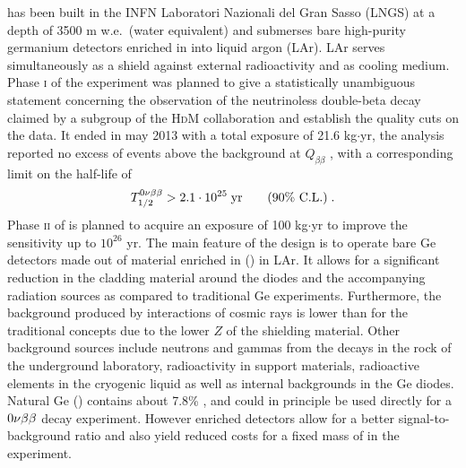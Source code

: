 {\gerda} has been built in the INFN Laboratori Nazionali del Gran Sasso (LNGS) at a depth of 3500 m w.e.~(water equivalent) and submerses bare high-purity germanium detectors enriched in  into liquid argon (LAr). LAr serves simultaneously as a shield against external radioactivity and as cooling medium. Phase \textsc{i} of the experiment was planned to give a statistically unambiguous statement concerning the observation of the neutrinoless double-beta decay claimed by a subgroup of the \textsc{HdM} collaboration \cite{hdmclaim} and establish the quality cuts on the data. It ended in may 2013 with a total exposure of 21.6 kg$\cdot$yr, the analysis reported no excess of events above the background at $Q_{\beta\beta}$ \cite{Agostini:2013mzu}, with a corresponding limit on the half-life of
\[T_{1/2}^{0\nu\beta\beta}>2.1\cdot10^{25}\;\text{yr}\qquad\text{(90\% C.L.)}\;.\]
Phase \textsc{ii} of {\gerda} is planned to acquire an exposure of 100 kg$\cdot$yr to improve the sensitivity up to $10^{26}$ yr.
\newpage
{} The main feature of the {\gerda} design is to operate bare Ge detectors made out of material enriched in  () in LAr. It allows for a significant reduction in the cladding material around the diodes and the accompanying radiation sources as compared to traditional Ge experiments. Furthermore, the background produced by interactions of cosmic rays is lower than for the traditional concepts due to the lower $Z$ of the shielding material. Other background sources include neutrons and gammas from the decays in the rock of the underground laboratory, radioactivity in support materials, radioactive elements in the cryogenic liquid as well as internal backgrounds in the Ge diodes. Natural Ge () contains about 7.8\% , and could in principle be used directly for a $0\nu\beta\beta$ decay experiment. However enriched detectors allow for a better signal-to-background ratio and also yield reduced costs for a fixed mass of  in the experiment.
